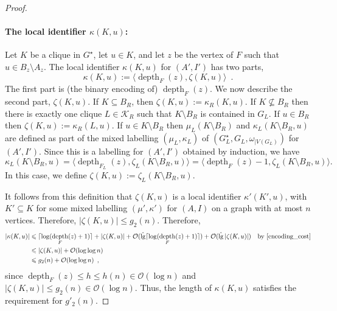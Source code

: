 \documentclass{patmorin}
\let\eqref\cref
\renewcommand{\le}{\leqslant}
\renewcommand{\leq}{\leqslant}
\DeclareMathOperator{\depth}{depth}
\DeclareMathOperator{\lgg}{\hat{lg}}
\newcommand{\Oh}{\mathcal{O}}
\DeclarePairedDelimiter{\ceil}{\lceil}{\rceil}
\begin{document}
\begin{proof}
    \paragraph{\boldmath The local identifier $\kappa(K,u)$:}
    Let $K$ be a clique in $G^\star$, let $u\in K$, and let $z$ be the vertex of $F$ such that $u\in B_z\setminus A_z$.   The local identifier $\kappa(K,u)$ for $(A',I')$ has two parts,
    \[
        \kappa(K,u) := \langle\depth_F(z),\zeta(K,u)\rangle \enspace .
    \]
    The first part is (the binary encoding of) $\depth_F(z)$. We now describe the second part, $\zeta(K,u)$.  If $K\subseteq B_R$, then $\zeta(K,u):=\kappa_R(K,u)$.
    If $K\not\subseteq B_R$ then there is exactly one clique $L\in\mathcal{K}_R$ such that $K\setminus B_R$ is contained in $G_L$.  If $u\in B_R$ then $\zeta(K,u):=\kappa_R(L,u)$.  If $u\in K\setminus B_R$ then $\mu_L(K\setminus B_R)$ and  $\kappa_L(K\setminus B_R, u)$ are defined as part of the mixed labelling $(\mu_L,\kappa_L)$ of $(G^\star_L,G_L,\omega_{|V(G_L)})$ for $(A',I')$.
    Since this is a labelling for $(A',I')$ obtained by induction, we have
    \begin{equation}
      \kappa_L(K\setminus B_R,u)=\langle\depth_{F_L}(z),\zeta_{L}(K\setminus B_R,u)\rangle=\langle\depth_F(z)-1,\zeta_L(K\setminus B_R,u)\rangle.
    \label{off_by_one}
    \end{equation}
    In this case, we define $\zeta(K,u):=\zeta_L(K\setminus B_R,u)$.

    It follows from this definition that $\zeta(K,u)$ is a local identifier $\kappa'(K',u)$, with $K'\subseteq K$ for some mixed labelling $(\mu',\kappa')$ for $(A,I)$ on a graph with at most $n$ vertices.  Therefore, $|\zeta(K,u)|\le g_2(n)$.  Therefore,
    \begin{align*}
      |\kappa(K,u)|
      & \le \ceil{\log(\depth_F(z)+1)} + |\zeta(K,u)|
      + \Oh(\lgg\ceil{\log(\depth_F(z)+1)}) + \Oh(\lgg|\zeta(K,u)|)
        & \text{by \eqref{encoding_cost}} \\
        &\leq |\zeta(K,u)| + \Oh(\log\log n)\\
        &\leq g_2(n) +  \Oh(\log\log n)\enspace,
    \end{align*}
    since $\depth_F(z)\le h\le h(n)\in \Oh(\log n)$ and $|\zeta(K,u)|\le g_2(n)\in\Oh(\log n)$.  Thus, the length of $\kappa(K,u)$ satisfies the requirement for $g'_2(n)$.


\end{proof}
\end{document}
